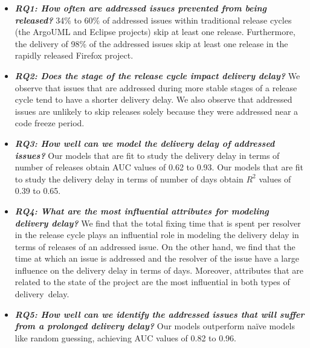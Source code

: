 \begin{itemize}
	\item \textbf{\textit{RQ1: How often are addressed issues prevented from
		being released?}} 34\% to 60\% of addressed issues within
		traditional release cycles (the ArgoUML and Eclipse projects)
		skip at least one release. Furthermore, the delivery of 98\% of
		the addressed issues skip at least one release in the rapidly
		released Firefox project.\\

	\item \textbf{\textit{RQ2: Does the stage of the release cycle 
		impact delivery delay?}} We observe that issues that
		are addressed during more stable stages of a release cycle tend to 
		have a shorter delivery delay. We also observe
		that addressed issues are unlikely to skip releases solely because they
		were addressed near a code freeze period.\\

	\item \textbf{\textit{RQ3: How well can we model the delivery delay of
		addressed issues?}} Our models that are fit to study the
		delivery delay in terms of number of releases obtain AUC values
		of 0.62 to 0.93. Our models that are fit to study the delivery
		delay in terms of number of days obtain $R^2$ values of 0.39 to
		0.65.\\

	\item \textbf{\textit{RQ4: What are the most influential attributes for
		modeling delivery delay?}} We find that the total fixing time
		that is spent per resolver in the release cycle plays an
		influential role in modeling the delivery delay in terms of
		releases of an addressed issue. On the other hand, we find that the
		time at which an issue is addressed and the resolver of the issue
		have a large influence on the delivery delay in terms of days.
		Moreover, attributes that are related to the state of the
		project are the most influential in both types of
		delivery~delay.
%
%
%

	\item \textbf{\textit{RQ5: How well can we identify the addressed issues
		that will suffer from a prolonged delivery delay?}} Our models
		outperform na\"{i}ve models like random guessing, achieving AUC
		values of 0.82 to 0.96.\\


\end{itemize}
